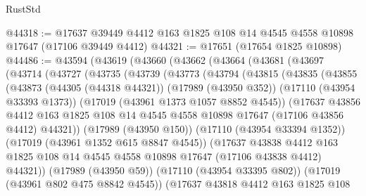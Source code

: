 \begin{lexlean}{RustStd}
\begin{coremodule}
@44318 := @17637 @39449 @4412 @163 @1825 @108 @14 @4545 @4558 @10898 @17647 (@17106 @39449 @4412)
@44321 := @17651 (@17654 @1825 @10898)
@44486 := @43594
    (@43619
      (@43660
        (@43662
          (@43664
            (@43681
              (@43697
                (@43714
                  (@43727
                    (@43735
                      (@43739
                        (@43773
                          (@43794
                            (@43815
                              (@43835
                                (@43855
                                  (@43873
                                    (@44305 (@44318 @44321))
                                    (@17989 (@43950 @352))
                                    (@17110 (@43954 @33393 @1373))
                                    (@17019 (@43961 @1373 @1057 @8852 @4545))
                                    (@17637
                                      @43856
                                      @4412
                                      @163
                                      @1825
                                      @108
                                      @14
                                      @4545
                                      @4558
                                      @10898
                                      @17647
                                      (@17106 @43856 @4412)
                                      @44321))
                                  (@17989 (@43950 @150))
                                  (@17110 (@43954 @33394 @1352))
                                  (@17019 (@43961 @1352 @615 @8847 @4545))
                                  (@17637
                                    @43838
                                    @4412
                                    @163
                                    @1825
                                    @108
                                    @14
                                    @4545
                                    @4558
                                    @10898
                                    @17647
                                    (@17106 @43838 @4412)
                                    @44321))
                                (@17989 (@43950 @59))
                                (@17110 (@43954 @33395 @802))
                                (@17019 (@43961 @802 @475 @8842 @4545))
                                (@17637
                                  @43818
                                  @4412
                                  @163
                                  @1825
                                  @108

\end{coremodule}
\end{lexlean}
